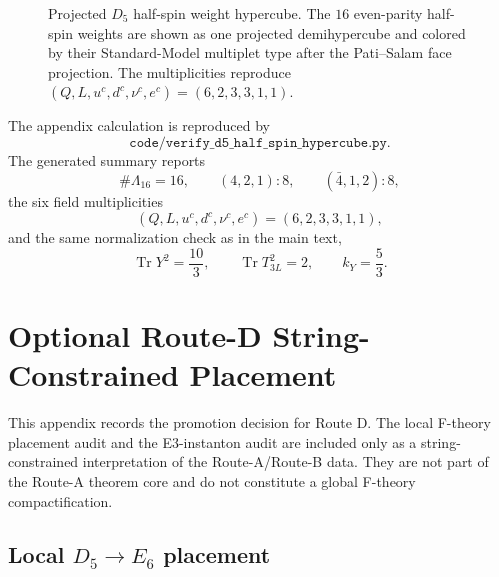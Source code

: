 \documentclass[
  aps,
  prd,
  preprint,
  nofootinbib,
  superscriptaddress,
  longbibliography
]{revtex4-2}
\DeclareMathOperator{\Tr}{Tr}
\begin{document}
\begin{figure}[t]
\caption{Projected \(D_5\) half-spin weight hypercube.  The \(16\) even-parity
half-spin weights are shown as one projected demihypercube and colored by
their Standard-Model multiplet type after the Pati--Salam face projection.
The multiplicities reproduce
\((Q,L,u^c,d^c,\nu^c,e^c)=(6,2,3,3,1,1)\).}
\label{fig:d5-half-spin-hypercube}
\end{figure}

The appendix calculation is reproduced by
\[
  \texttt{code/verify\_d5\_half\_spin\_hypercube.py}.
\]
The generated summary reports
\[
  \#\Lambda_{16}=16,\qquad
  (4,2,1):8,\qquad
  (\bar4,1,2):8,
\]
the six field multiplicities
\[
  (Q,L,u^c,d^c,\nu^c,e^c)=(6,2,3,3,1,1),
\]
and the same normalization check as in the main text,
\[
  \Tr Y^2=\frac{10}{3},\qquad
  \Tr T_{3L}^2=2,\qquad
  k_Y=\frac53.
\]

\section{Optional Route-D String-Constrained Placement}
\label{app:route-d-string}

This appendix records the promotion decision for Route D.  The local
F-theory placement audit and the E3-instanton audit are included only as a
string-constrained interpretation of the Route-A/Route-B data.  They are not
part of the Route-A theorem core and do not constitute a global F-theory
compactification.

\subsection{Local \texorpdfstring{\(D_5\to E_6\)}{D5 to E6} placement}
\end{document}
